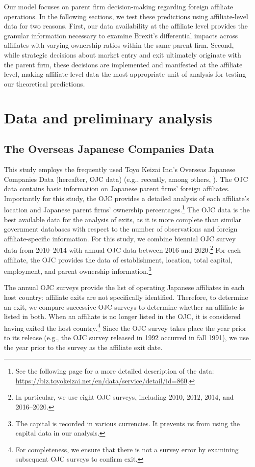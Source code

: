 \documentclass[preprint,11pt,authoryear]{elsarticle}
\begin{document}
Our model focuses on parent firm decision-making regarding foreign affiliate operations. In the following sections, we test these predictions using affiliate-level data for two reasons. First, our data availability at the affiliate level provides the granular information necessary to examine Brexit's differential impacts across affiliates with varying ownership ratios within the same parent firm. Second, while strategic decisions about market entry and exit ultimately originate with the parent firm, these decisions are implemented and manifested at the affiliate level, making affiliate-level data the most appropriate unit of analysis for testing our theoretical predictions.




\section{Data and preliminary analysis \label{sec:data}}
\subsection{The Overseas Japanese Companies Data}

This study employs the frequently used Toyo Keizai Inc.'s Overseas Japanese Companies Data (hereafter, OJC data) (e.g., recently, among others, \citealt{Bederbos2021, cieslik2022brexit}). The OJC data contains basic information on Japanese parent firms' foreign affiliates. Importantly for this study, the OJC provides a detailed analysis of each affiliate's location and Japanese parent firms' ownership percentages.\footnote{See the following page for a more detailed description of the data: \url{https://biz.toyokeizai.net/en/data/service/detail/id=860}.} The OJC data is the best available data for the analysis of exits, as it is more complete than similar government databases with respect to the number of observations and foreign affiliate-specific information. 
For this study, we combine biennial OJC survey data from 2010--2014 with annual OJC data between 2016 and 2020.\footnote{In particular, we use eight OJC surveys, including 2010, 2012, 2014, and 2016--2020.} For each affiliate, the OJC provides the data of establishment, location, total capital, employment, and parent ownership information.\footnote{The capital is recorded in various currencies. It prevents us from using the capital data in our analysis.} 


The annual OJC surveys provide the list of operating Japanese affiliates in each host country; affiliate exits are not specifically identified. Therefore, to determine an exit, we compare successive OJC surveys to determine whether an affiliate is listed in both. When an affiliate is no longer listed in the OJC, it is considered having exited the host country.\footnote{For completeness, we ensure that there is not a survey error by examining subsequent OJC surveys to confirm exit.} Since the OJC survey takes place the year prior to its release (e.g., the OJC survey released in 1992 occurred in fall 1991), we use the year prior to the survey as the affiliate exit date. 
\end{document}
